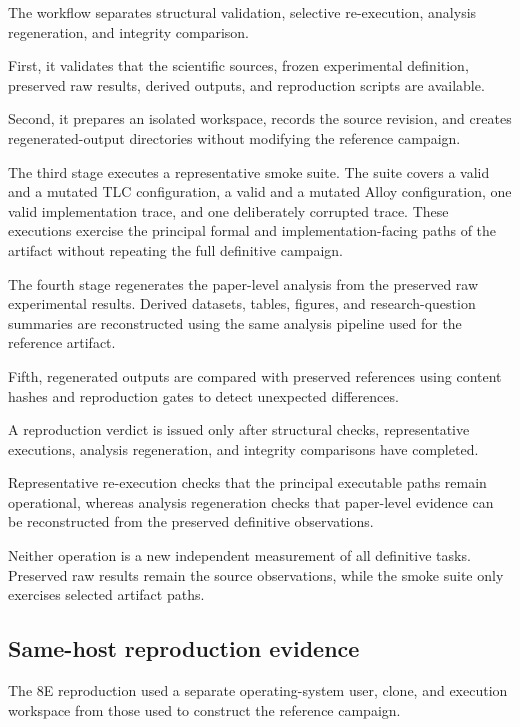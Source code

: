 The workflow separates structural validation, selective re-execution,
analysis regeneration, and integrity comparison.

First, it validates that the scientific sources, frozen experimental
definition, preserved raw results, derived outputs, and reproduction scripts
are available.

Second, it prepares an isolated workspace, records the source revision, and
creates regenerated-output directories without modifying the reference
campaign.

The third stage executes a representative smoke suite. The suite covers
a valid and a mutated TLC configuration, a valid and a mutated Alloy
configuration, one valid implementation trace, and one deliberately
corrupted trace. These executions exercise the principal formal and
implementation-facing paths of the artifact without repeating the full
definitive campaign.

The fourth stage regenerates the paper-level analysis from the preserved
raw experimental results. Derived datasets, tables, figures, and
research-question summaries are reconstructed using the same analysis
pipeline used for the reference artifact.

Fifth, regenerated outputs are compared with preserved references using
content hashes and reproduction gates to detect unexpected differences.

A reproduction verdict is issued only after structural checks, representative
executions, analysis regeneration, and integrity comparisons have completed.

Representative re-execution checks that the principal executable paths remain
operational, whereas analysis regeneration checks that paper-level evidence
can be reconstructed from the preserved definitive observations.

Neither operation is a new independent measurement of all definitive tasks.
Preserved raw results remain the source observations, while the smoke suite
only exercises selected artifact paths.

\subsection{Same-host reproduction evidence}
\label{subsec:independent-reproduction}

The 8E reproduction used
a separate operating-system user, clone, and execution workspace from those
used to construct the reference campaign.


